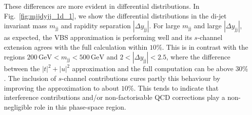 \documentclass[twocolumn,epjc3]{svjour3} %
\newcommand{\Pj}{\ensuremath{\text{j}}\xspace}
\newcommand{\GeV}{\ensuremath{\,\text{GeV}}\xspace}
\begin{document}
    These differences are more evident in differential distributions.
    In Fig.~\ref{fig:mjjdyjj_1d_1}, we show the differential distributions in the di-jet invariant mass $m_{\Pj\Pj}$ and rapidity separation $|\Delta y_{\Pj\Pj}|$.
    For large $m_{\Pj\Pj}$ and large $|\Delta y_{\Pj\Pj}|$, as expected, the VBS approximation is performing well and its $s$-channel extension agrees with the full calculation within $10\%$.
    This is in contrast with the regions  $200 \GeV < m_{\Pj\Pj} < 500 \GeV$ and $2<|\Delta y_{\Pj\Pj}|<2.5$, where
    the difference between the $|t|^2+|u|^2$ approximation and the full computation can be above $30\%$.
    The inclusion of $s$-channel contributions cures partly this behaviour by improving the approximation to about $10\%$.
    This tends to indicate that interference contributions and/or non-factorisable QCD corrections play a non-negligible role in this phase-space region.
\end{document}
